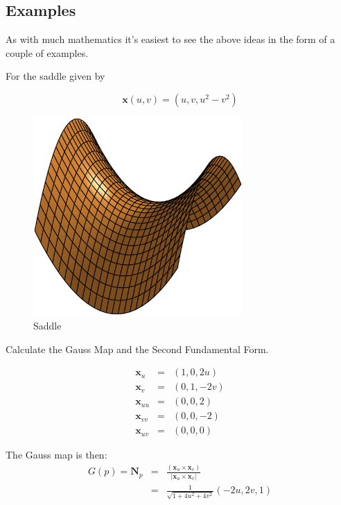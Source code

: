 \subsection{Examples}
As with much mathematics it's easiest to see the above ideas in the form of a couple of examples.
\begin{example}
\label{Saddle}
For the saddle given by 

\begin{displaymath}
\mathbf x(u,v) = (u,v,u^2-v^2)
\end{displaymath}

\begin{figure}[htbp]
	\centering
       \includegraphics[width=8cm]{Images/Saddle.eps}
   \caption{Saddle}
   \label{fig:saddle}
\end{figure} 

Calculate the Gauss Map and the Second Fundamental Form. 

\begin{eqnarray}
\nonumber
\mathbf x_u &=& (1, 0 , 2u) \\
\nonumber
\mathbf x_v &=& (0, 1, -2v) \\
\nonumber
\mathbf x_{uu} &=& (0, 0 , 2) \\
\nonumber
\mathbf x_{vv} &=& (0, 0, -2) \\
\nonumber
\mathbf x_{uv} &=& (0, 0 , 0)
\end{eqnarray}

The Gauss map is then:
\begin{eqnarray}
\nonumber
G(p) = \mathbf N_p &=& \frac{(\mathbf x_u \times \mathbf x_v)}{|\mathbf x_u \times \mathbf x_v|} \\
\nonumber
&=&\frac{1}{\sqrt{1+4u^2+4v^2}}(-2u,2v,1)
\end{eqnarray}


\end{example}
